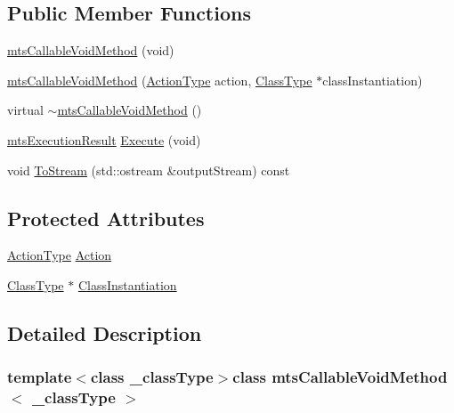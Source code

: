 \subsection*{Public Member Functions}
\begin{DoxyCompactItemize}
\item 
\hyperlink{classmts_callable_void_method_a158a2148635b673b555cb8dcd086d1c7}{mts\+Callable\+Void\+Method} (void)
\item 
\hyperlink{classmts_callable_void_method_afb25fb92ad9d9e3da75bdd5366825d10}{mts\+Callable\+Void\+Method} (\hyperlink{classmts_callable_void_method_af30fcc122aaea0b5870f22f57cf5e5ba}{Action\+Type} action, \hyperlink{classmts_callable_void_method_a912290d7a57cc13fd33481e16d471467}{Class\+Type} $\ast$class\+Instantiation)
\item 
virtual \hyperlink{classmts_callable_void_method_acef41c52bec2a6e4006fcd0b69e632d3}{$\sim$mts\+Callable\+Void\+Method} ()
\item 
\hyperlink{classmts_execution_result}{mts\+Execution\+Result} \hyperlink{classmts_callable_void_method_afb66294b89a3c6281c70c462e3bf6c85}{Execute} (void)
\item 
void \hyperlink{classmts_callable_void_method_a252f8bc56f87741e9ad72319ead73302}{To\+Stream} (std\+::ostream \&output\+Stream) const 
\end{DoxyCompactItemize}
\subsection*{Protected Attributes}
\begin{DoxyCompactItemize}
\item 
\hyperlink{classmts_callable_void_method_af30fcc122aaea0b5870f22f57cf5e5ba}{Action\+Type} \hyperlink{classmts_callable_void_method_a120365b9d9e484ec6c6d8dd4b5259abd}{Action}
\item 
\hyperlink{classmts_callable_void_method_a912290d7a57cc13fd33481e16d471467}{Class\+Type} $\ast$ \hyperlink{classmts_callable_void_method_a51691984cb4776eeb1e7871df86b463e}{Class\+Instantiation}
\end{DoxyCompactItemize}


\subsection{Detailed Description}
\subsubsection*{template$<$class \+\_\+class\+Type$>$class mts\+Callable\+Void\+Method$<$ \+\_\+class\+Type $>$}

